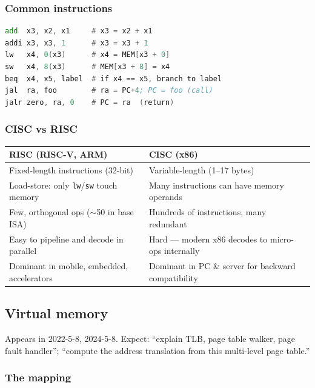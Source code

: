 \documentclass[11pt,a4paper]{article}
\begin{document}
\subsubsection*{Common instructions}

\begin{lstlisting}[language=asm]
add  x3, x2, x1     # x3 = x2 + x1
addi x3, x3, 1      # x3 = x3 + 1
lw   x4, 0(x3)      # x4 = MEM[x3 + 0]
sw   x4, 8(x3)      # MEM[x3 + 8] = x4
beq  x4, x5, label  # if x4 == x5, branch to label
jal  ra, foo        # ra = PC+4; PC = foo (call)
jalr zero, ra, 0    # PC = ra  (return)
\end{lstlisting}

\subsubsection*{CISC vs RISC}

\begin{center}
\begin{tabular}{p{6cm}p{8.5cm}}
\hline
\textbf{RISC (RISC-V, ARM)} & \textbf{CISC (x86)} \\
\hline
Fixed-length instructions (32-bit) & Variable-length (1--17 bytes) \\
Load-store: only \texttt{lw}/\texttt{sw} touch memory & Many instructions can have memory operands \\
Few, orthogonal ops ($\sim$50 in base ISA) & Hundreds of instructions, many redundant \\
Easy to pipeline and decode in parallel & Hard --- modern x86 decodes to micro-ops internally \\
Dominant in mobile, embedded, accelerators & Dominant in PC \& server for backward compatibility \\
\hline
\end{tabular}
\end{center}

\subsection{Virtual memory}

\begin{useful}
Appears in 2022-5-8, 2024-5-8. Expect: ``explain TLB, page table walker, page fault handler''; ``compute the address translation from this multi-level page table.''
\end{useful}

\subsubsection*{The mapping}
\end{document}
